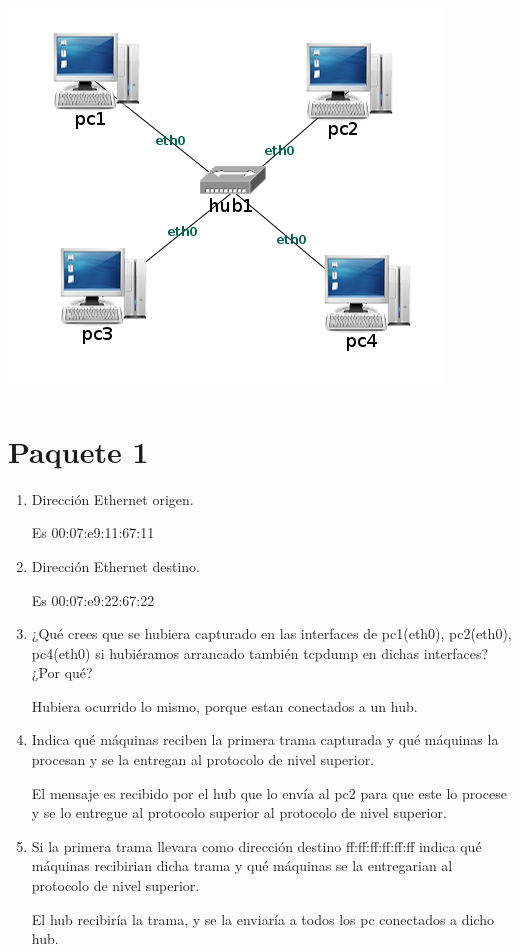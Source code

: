 \documentclass[12pt, a4paper]{report}
\begin{document}
\includegraphics*[scale=0.5, center]{enunciado3}
\setcounter{section}{0}
\section{Paquete 1}
\begin{enumerate}[label=\alph*]
	\item Dirección Ethernet origen.
	
	Es 00:07:e9:11:67:11
	\item Dirección Ethernet destino. 
	
	Es 00:07:e9:22:67:22
	\item ¿Qué crees que se hubiera capturado en las interfaces de pc1(eth0), pc2(eth0), pc4(eth0) si hubiéramos arrancado también tcpdump en dichas interfaces? ¿Por qué?
	
	Hubiera ocurrido lo mismo, porque estan conectados a un hub.
	\item Indica qué máquinas reciben la primera trama capturada y qué máquinas la procesan y se la entregan
	al protocolo de nivel superior.
	
	El mensaje es recibido por el hub que lo envía al pc2 para que este lo procese y se lo entregue al protocolo superior
	al protocolo de nivel superior.
	\item Si la primera trama llevara como dirección destino ff:ff:ff:ff:ff:ff indica qué máquinas recibirian dicha
	trama y qué máquinas se la entregarian al protocolo de nivel superior.
	
	El hub recibiría la trama, y se la enviaría a todos los pc conectados a dicho hub.
\end{enumerate}
\end{document}

